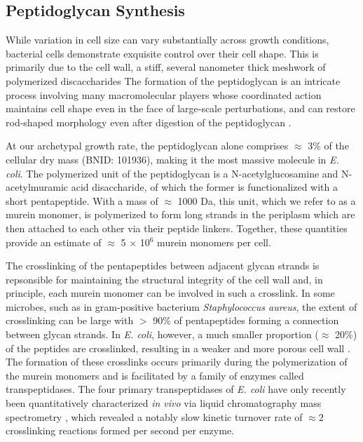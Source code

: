 \subsection{Peptidoglycan Synthesis}
While variation in cell size can vary substantially across growth conditions,
bacterial cells demonstrate exquisite control over their cell shape. This is
primarily due to the cell wall, a stiff, several nanometer thick meshwork of polymerized discaccharides
The formation of the peptidoglycan is an intricate process involving many
macromolecular players \citep{shi2018, morgenstein2015} whose coordinated
action maintains cell shape even in the face of large-scale perturbations, and can
restore rod-shaped morphology even after digestion of the peptidoglycan
\citep{harris2018,shi2018}.

At our archetypal growth rate, the peptidoglycan alone comprises
$\approx$ 3\% of the cellular dry mass (BNID: 101936), making
it the most massive molecule in \textit{E. coli}. The polymerized unit of the
peptidoglycan is a N-acetylglucosamine and N-acetylmuramic acid disaccharide,
of which the former is functionalized with a short pentapeptide. With a mass of
$\approx$ 1000 Da, this unit, which we refer to as a murein monomer, is
polymerized to form long strands in the periplasm which are then attached to
each other via their peptide linkers. Together, these quantities provide an
estimate of $\approx$ 5 $\times$ 10$^6$ murein monomers per cell.

The crosslinking of the pentapeptides between adjacent glycan strands is
repsonsible for maintaining the structural integrity of the cell wall and, in
principle, each murein monomer can be involved in such a crosslink. In some
microbes, such as in gram-positive bacterium \textit{Staphylococcus aureus},
the extent of crosslinking can be large with $>$ 90\% of pentapeptides
forming a connection between glycan strands. In \textit{E. coli}, however, a
much smaller proportion ($\approx$ 20\%) of the peptides are crosslinked,
resulting in a weaker and more porous cell wall \cite{vollmer2008a,
rogers1980}. The formation of these crosslinks occurs primarily during the
polymerization of the murein monomers and is facilitated by a family of
enzymes called transpeptidases. The four primary transpeptidases of
\textit{E. coli} have only recently been quantitatively characterized
\textit{in vivo} via liquid chromatography mass spectrometry
\citep{catherwood2020}, which revealed a notably slow kinetic turnover rate
of $\approx 2$ crosslinking reactions formed per second per enzyme.

